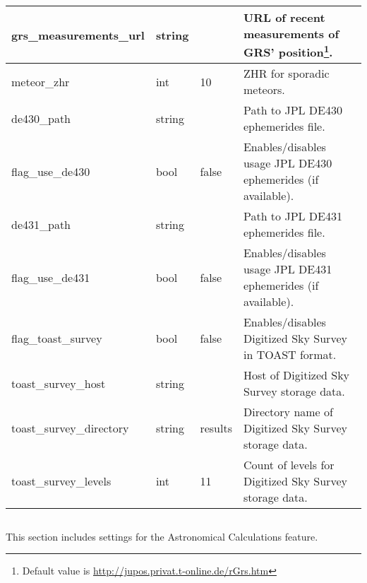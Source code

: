 \begin{longtable}{l|l|l|p{55mm}}
grs\_measurements\_url             & string &       & URL of recent measurements of GRS' position\footnote{Default value is \url{http://jupos.privat.t-online.de/rGrs.htm}}. \\\midrule
%
meteor\_zhr                        & int    & 10    & ZHR for sporadic meteors.\\\midrule
%
de430\_path                        & string &       & Path to JPL DE430 ephemerides file.\\%
flag\_use\_de430                   & bool   & false & Enables/disables usage JPL DE430 ephemerides (if available).\\%
de431\_path                        & string &       & Path to JPL DE431 ephemerides file.\\%
flag\_use\_de431                   & bool   & false & Enables/disables usage JPL DE431 ephemerides (if available).\\\midrule
%
flag\_toast\_survey                & bool   & false & Enables/disables Digitized Sky Survey in TOAST format.\\%
toast\_survey\_host                & string &       & Host of Digitized Sky Survey storage data.\\%
toast\_survey\_directory           & string & results & Directory name of Digitized Sky Survey storage data.\\%
toast\_survey\_levels              & int    & 11    & Count of levels for Digitized Sky Survey storage data.\\\bottomrule
\end{longtable}

\subsection{}

This section includes settings for the Astronomical Calculations feature.

